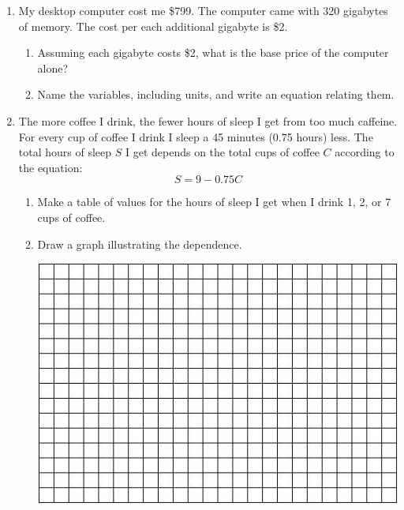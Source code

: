 \documentclass[12pt]{article}
\begin{document}
\begin{enumerate}

\item My desktop computer cost me \$799.  The computer came with 320 gigabytes of memory.  The cost per each additional gigabyte is \$2.  

\begin{enumerate}
\item Assuming each gigabyte costs \$2, what is the base price of the computer alone?
\vfill

\item Name the variables, including units, and write an equation relating them.
\vfill
\vfill
\end{enumerate}

\newpage %

\item The more coffee I drink, the fewer hours of sleep I get from too much caffeine.  For every cup of coffee I drink I sleep a 45 minutes (0.75 hours) less.  The total hours of sleep $S$ I get depends on the total cups of coffee $C$ according to the equation: $$S=9-0.75C$$

\begin{enumerate}
\item Make a table of values for the hours of sleep I get when I drink 1, 2, or 7 cups of coffee. 
\vfill
\vfill
\item Draw a graph illustrating the dependence.  

\vspace{.1in}
\begin{center}
 {\includegraphics [width = 6in] {../GraphPaper}}
\end{center}
\vspace{.1in}


\end{enumerate}
\end{enumerate}
\end{document}
